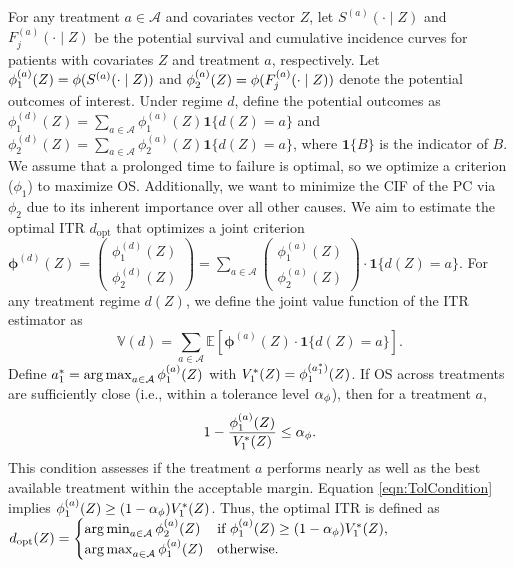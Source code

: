 For any treatment $a \in \mathcal{A}$ and covariates vector $Z$, let $S^{(a)}(\cdot \mid Z)$ and $F_j^{(a)}(\cdot \mid Z)$ be the potential survival and cumulative incidence curves for patients with covariates $Z$ and treatment $a$, respectively. Let $\phi_1^{(a)}(Z) = \phi(S^{(a)}(\cdot \mid Z))$ and $\phi_2^{(a)}(Z) = \phi(F_j^{(a)}(\cdot \mid Z))$ denote the potential outcomes of interest. 
Under regime $d$, define the potential outcomes as $\phi_1^{(d)}(Z) = \sum_{a \in \mathcal{A}} \phi_1^{(a)}(Z) \mathbf{1}\{d(Z) = a\}$ and $\phi_2^{(d)}(Z) = \sum_{a \in \mathcal{A}} \phi_2^{(a)}(Z) \mathbf{1}\{d(Z) = a\}$, where $\mathbf{1}\{B\}$ is the indicator of $B$.
We assume that a prolonged time to failure is optimal, so we optimize a criterion ($\phi_1$) to maximize OS. Additionally, we want to minimize the CIF of the PC via $\phi_2$ due to its inherent importance over all other causes. 
{We aim to estimate the optimal ITR $d_{\text{opt}}$ that optimizes a joint criterion $\boldsymbol{\phi}^{(d)}(Z) = \begin{pmatrix}
\phi_1^{(d)}(Z) \\ 
\phi_2^{(d)}(Z)
\end{pmatrix} = 
\sum_{a \in \mathcal{A}} \begin{pmatrix}
\phi_1^{(a)}(Z) \\ 
\phi_2^{(a)}(Z)
\end{pmatrix}
\cdot \mathbf{1}\{d(Z) = a\}$.
} 
For any treatment regime $d(Z)$, we define the joint value function of the ITR estimator as
\begin{equation*}
    \mathbb{V}(d) = 
    \sum_{a \in \mathcal{A}} \mathbb{E}\left[ 
    \boldsymbol{\phi}^{(a)}(Z)
\cdot \mathbf{1}\{d(Z) = a\}
\right].
\end{equation*}
Define $a_1^* = \operatorname*{arg\,max}_{a \in \mathcal{A}} \phi_1^{(a)}(Z)$ with $\valueonemax = \phi^{(\actiononemax)}_1(Z)%
$. If OS across treatments are sufficiently close (i.e., within a tolerance level $\alpha_{\phi}$), then for a treatment $a$, 
\begin{equation}
    \label{eqn:TolCondition}
   1 - \frac{\phi_1^{(a)}(Z)}{V_1^*(Z)} \le \alpha_{\phi}.
\end{equation}
This condition assesses if the treatment $a$ performs nearly as well as the best available treatment within the acceptable margin. Equation \cref{eqn:TolCondition} implies $\phi_1^{(a)}(Z) \ge (1-\alpha_{\phi})V_1^*(Z)$. Thus, the optimal ITR is defined as
$
     d_{\text{opt}}(Z) = 
     \begin{cases}
     \operatorname*{arg\,min}_{a \in \mathcal{A}} \phi_2^{(a)}(Z) & \text{if } \phi_1^{(a)}(Z) \ge (1-\alpha_{\phi})V_1^*(Z),\\
     \operatorname*{arg\,max}_{a \in \mathcal{A}} \phi_1^{(a)}(Z) & \text{otherwise.}
     \end{cases}
$